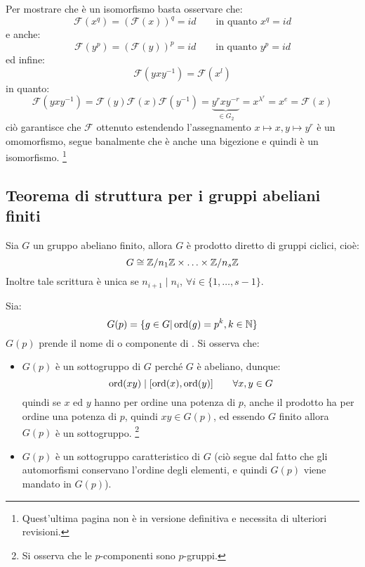 \documentclass[11pt]{scrartcl}
\begin{document}
Per mostrare che è un isomorfismo basta osservare che:
    \[ \mathcal{F}(x^q) = (\mathcal{F}(x))^q = id \qquad \text{in quanto $x^q = id$}
        \]
e anche:
    \[ \mathcal{F}(y^p) = (\mathcal{F}(y))^p = id \qquad \text{in quanto $y^p = id$}
        \]
ed infine:
    \[ \mathcal{F}(yxy^{-1}) = \mathcal{F}(x^l)
        \]
in quanto:
    \[ \mathcal{F}(yxy^{-1}) = \mathcal{F}(y) \mathcal{F}(x) \mathcal{F}(y^{-1}) = \underbrace{y^rxy^{-r}}_{\in G_2} = x^{\lambda^{r}} = x^e = \mathcal{F}(x)
        \]
ciò garantisce che $\mathcal{F}$ ottenuto estendendo l'assegnamento $x \longmapsto x, y \longmapsto y^r$ è un omomorfismo, segue banalmente che è anche una bigezione e quindi è un isomorfismo. \footnote{Quest'ultima pagina non è in versione 
definitiva e necessita di ulteriori revisioni.}

\newpage
\subsection{Teorema di struttura per i gruppi abeliani finiti}

\begin{theorem}
    \label{t:struttura}
    Sia $G$ un gruppo abeliano finito, allora $G$ è prodotto diretto di gruppi ciclici, cioè:
        \[ G \cong \mathbb{Z}/{n_1}\mathbb{Z} \times \ldots \times \mathbb{Z}/{n_s}\mathbb{Z}
            \]
    Inoltre tale scrittura è unica se $n_{i+1} \mid n_i$, $\forall i \in \{1,\ldots,s-1\}$.
\end{theorem}

\begin{remark}
    Sia:
        \[ G(p) = \{g \in G | \operatorname{ord}(g) = p^k, k \in \mathbb N\}
            \]
    $G(p)$ prende il nome di  o componente di .
    Si osserva che:
        \begin{itemize}
            \item $G(p)$ è un sottogruppo di $G$ perché $G$ è abeliano, dunque:
                \[ \operatorname{ord}(xy) \mid [\operatorname{ord}(x),\operatorname{ord}(y)] \qquad \forall x,y \in G
                    \]
                quindi se $x$ ed $y$ hanno per ordine una potenza di $p$, anche il prodotto ha per ordine una potenza di $p$, quindi $xy \in G(p)$, ed essendo 
                $G$ finito allora $G(p)$ è un sottogruppo. \footnote{Si osserva che le $p$-componenti sono $p$-gruppi.}
            \item $G(p)$ è un sottogruppo caratteristico di $G$ (ciò segue dal fatto che gli automorfismi conservano l'ordine degli elementi, e quindi $G(p)$ viene mandato in $G(p)$).
        \end{itemize}
\end{remark}
\end{document}
